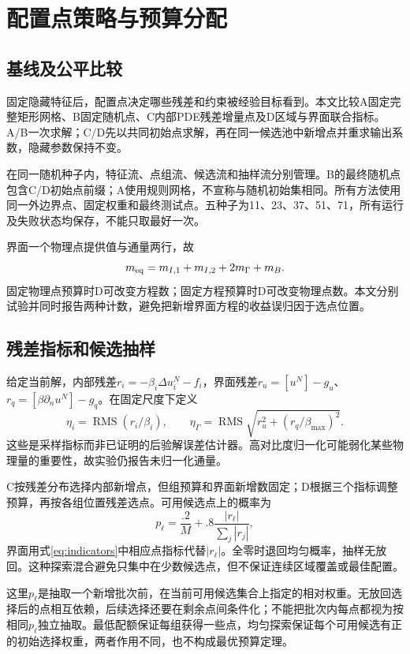 \chapter{配置点策略与预算分配}
\section{基线及公平比较}
固定隐藏特征后，配置点决定哪些残差和约束被经验目标看到。本文比较A固定完整矩形网格、B固定随机点、C内部PDE残差增量点及D区域与界面联合指标。A/B一次求解；C/D先以共同初始点求解，再在同一候选池中新增点并重求输出系数，隐藏参数保持不变。

在同一随机种子内，特征流、点组流、候选流和抽样流分别管理。B的最终随机点包含C/D初始点前缀；A使用规则网格，不宣称与随机初始集相同。所有方法使用同一外边界点、固定权重和最终测试点。五种子为11、23、37、51、71，所有运行及失败状态均保存，不能只取最好一次。

界面一个物理点提供值与通量两行，故
\begin{equation}
m_{\rm eq}=m_{I,1}+m_{I,2}+2m_\Gamma+m_B.
\end{equation}
固定物理点预算时D可改变方程数；固定方程预算时D可改变物理点数。本文分别试验并同时报告两种计数，避免把新增界面方程的收益误归因于选点位置。

\section{残差指标和候选抽样}
给定当前解，内部残差$r_i=-\beta_i\Delta u_i^N-f_i$，界面残差$r_u=[u^N]-g_u$、$r_q=[\beta\partial_n u^N]-g_q$。在固定尺度下定义
\begin{equation}\label{eq:indicators}
\eta_i=\operatorname{RMS}(r_i/\beta_i),\qquad
\eta_\Gamma=\operatorname{RMS}\sqrt{r_u^2+(r_q/\beta_{\max})^2}.
\end{equation}
这些是采样指标而非已证明的后验解误差估计器。高对比度归一化可能弱化某些物理量的重要性，故实验仍报告未归一化通量。

C按残差分布选择内部新增点，但组预算和界面新增数固定；D根据三个指标调整预算，再按各组位置残差选点。可用候选点上的概率为
\begin{equation}
p_\ell=\frac{.2}{M}+.8\frac{|r_\ell|}{\sum_j|r_j|},
\end{equation}
界面用式\eqref{eq:indicators}中相应点指标代替$|r_\ell|$。全零时退回均匀概率，抽样无放回。这种探索混合避免只集中在少数候选点，但不保证连续区域覆盖或最佳配置。

这里$p_\ell$是抽取一个新增批次前，在当前可用候选集合上指定的相对权重。无放回选择后的点相互依赖，后续选择还要在剩余点间条件化；不能把批次内每点都视为按相同$p_\ell$独立抽取。最低配额保证每组获得一些点，均匀探索保证每个可用候选有正的初始选择权重，两者作用不同，也不构成最优预算定理。

